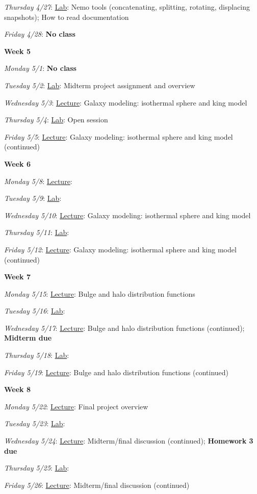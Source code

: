 \documentclass[12pt]{article}
\begin{document}
\emph{Thursday 4/27}: \underline{Lab}: Nemo tools (concatenating, splitting, rotating, displacing snapshots); How to read documentation

\emph{Friday 4/28}: \textbf{No class}

\noindent\textbf{Week 5}

\emph{Monday 5/1}: \textbf{No class}

\emph{Tuesday 5/2}: \underline{Lab}: Midterm project assignment and overview

\emph{Wednesday 5/3}: \underline{Lecture}: Galaxy modeling: isothermal sphere and king model

\emph{Thursday 5/4}: \underline{Lab}: Open session

\emph{Friday 5/5}: \underline{Lecture}: Galaxy modeling: isothermal sphere and king model (continued)

\noindent\textbf{Week 6}

\emph{Monday 5/8}: \underline{Lecture}: 

\emph{Tuesday 5/9}: \underline{Lab}:

\emph{Wednesday 5/10}: \underline{Lecture}: Galaxy modeling: isothermal sphere and king model

\emph{Thursday 5/11}: \underline{Lab}:

\emph{Friday 5/12}: \underline{Lecture}: Galaxy modeling: isothermal sphere and king model (continued)

\noindent\textbf{Week 7}

\emph{Monday 5/15}: \underline{Lecture}: Bulge and halo distribution functions

\emph{Tuesday 5/16}: \underline{Lab}:

\emph{Wednesday 5/17}: \underline{Lecture}: Bulge and halo distribution functions (continued); \textbf{Midterm due}

\emph{Thursday 5/18}: \underline{Lab}:

\emph{Friday 5/19}: \underline{Lecture}: Bulge and halo distribution functions (continued)

\noindent\textbf{Week 8}

\emph{Monday 5/22}: \underline{Lecture}: Final project overview

\emph{Tuesday 5/23}: \underline{Lab}:

\emph{Wednesday 5/24}: \underline{Lecture}: Midterm/final discussion (continued);  \textbf{Homework 3 due}

\emph{Thursday 5/25}: \underline{Lab}:

\emph{Friday 5/26}: \underline{Lecture}: Midterm/final discussion (continued)
\end{document}
